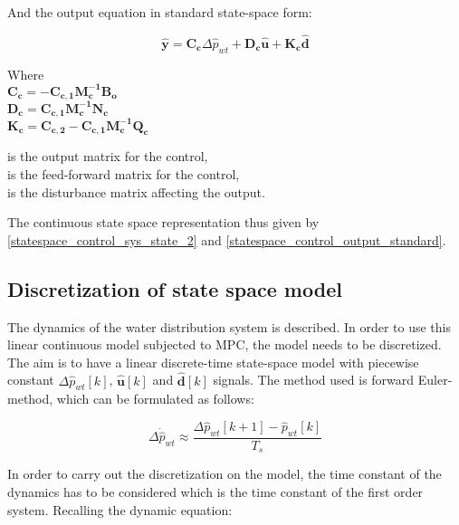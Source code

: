 And the output equation in standard state-space form:

\begin{equation}
  \bm{\hat{y}} = \bm{C_c} \Delta \hat{p}_{wt} + \bm{D_c} \bm{\hat{u}} + \bm{K_c} \bm{\hat{d}}
\label{statespace_control_output_standard}
\end{equation}

\begin{minipage}[t]{0.40\textwidth}
Where\\
\hspace*{8mm} $\bm{C_c} = -\bm{C_{c,1}}\bm{M_c^{-1}}\bm{B_o} $ \\
\hspace*{8mm} $\bm{D_c} =  \bm{C_{c,1}}\bm{M_c^{-1}}\bm{N_c} $ \\
\hspace*{8mm} $\bm{K_c} = \bm{C_{c,2}} -\bm{C_{c,1}}\bm{M_c^{-1}}\bm{Q_c} $
\end{minipage}
\begin{minipage}[t]{0.58\textwidth}
\vspace*{1mm}
is the output matrix for the control, \\
is the feed-forward matrix for the control, \\
is the disturbance matrix affecting the output.
\end{minipage} 

The continuous state space representation thus given by \eqref{statespace_control_sys_state_2} and \eqref{statespace_control_output_standard}.

\subsection{Discretization of state space model}
 \label{discrete_SS}
 
The dynamics of the water distribution system is described. In order to use this linear continuous model subjected to MPC, the model needs to be discretized. The aim is to have a linear discrete-time state-space model with piecewise constant $\Delta \hat{p}_{wt}[k]$, $\bm{\hat{u}}[k]$ and $\bm{\hat{d}}[k]$ signals. The method used is forward Euler-method, which can be formulated as follows:

\begin{equation}
\Delta \dot{\hat{p}}_{wt} \approx  \frac{\Delta \hat{p}_{wt}[k+1] - \hat{p}_{wt}[k]}{T_s} 
 \label{statespace_discrete_state1}
\end{equation}

In order to carry out the discretization on the model, the time constant of the dynamics has to be considered which is the time constant of the first order system. Recalling the dynamic equation:

